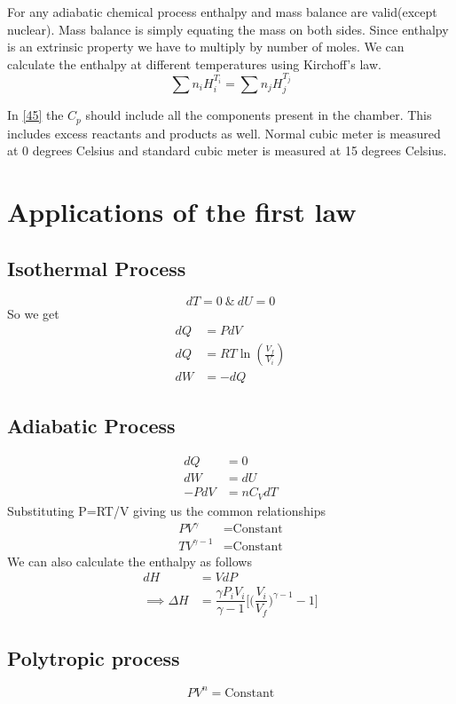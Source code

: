 \documentclass[12pt]{article}
\begin{document}
For any adiabatic chemical process enthalpy and mass balance are valid(except nuclear). Mass balance is simply equating the mass on both sides. Since enthalpy is an extrinsic  property we have to multiply by number of moles. We can calculate the enthalpy at different temperatures using Kirchoff's law. $$\sum n_i H_{i}^{T_i}=\sum n_j H_{j}^{T_j} $$

In \eqref{45} the $ C_p $ should include all the components present in the chamber. This includes excess reactants and products as well. Normal cubic meter is measured at 0 degrees Celsius and standard cubic meter is measured at 15 degrees Celsius. 

\section{Applications of the first law}
\subsection{Isothermal Process}
$$ dT=0\ \& \ dU=0$$So we get
\begin{align*}
    dQ&=PdV\\
    dQ&=RT\ln(\frac{V_f}{V_i})\\
    dW&=-dQ
\end{align*}

\subsection{Adiabatic Process}
\begin{align*}
	dQ&=0\\
	dW&=dU\\
  -PdV&=nC_VdT	
\end{align*}
Substituting P=RT/V giving us the common relationships
\begin{align}
	    PV^\gamma&=\text{Constant}\\
	TV^{\gamma-1}&=\text{Constant} 
\end{align}
We can also calculate the enthalpy as follows 
\begin{align}
	           dH&=VdP\\
\implies \Delta H&=\dfrac{\gamma P_iV_i}{\gamma-1}\Bigg[\Bigg(\dfrac{V_i}{V_f}\Bigg)^{\gamma-1}-1\Bigg]
\end{align}

\subsection{Polytropic process}
\begin{equation}
	PV^n=\text{Constant}
\end{equation}
\end{document}
